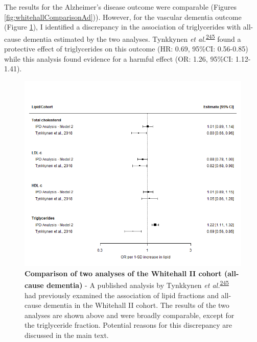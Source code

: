 \documentclass[a4paper, twoside]{templates/ociamthesis}
\begin{document}
The results for the Alzheimer's disease outcome were comparable (Figures \ref{fig:whitehallComparisonAd})). However, for the vascular dementia outcome (Figure \ref{fig:whitehallComparisonDementia}), I identified a discrepancy in the association of triglycerides with all-cause dementia estimated by the two analyses. Tynkkynen \emph{et al.}\textsuperscript{\protect\hyperlink{ref-tynkkynen2018}{245}} found a protective effect of triglycerides on this outcome (HR: 0.69, 95\%CI: 0.56-0.85) while this analysis found evidence for a harmful effect (OR: 1.26, 95\%CI: 1.12-1.41).





\begin{figure}[H]
\includegraphics[width=1\linewidth]{figures/ipd/whitehall_comparison_dementia} \caption[Comparison of two analyses of the Whitehall II cohort (all-cause dementia)]{\textbf{Comparison of two analyses of the Whitehall II cohort (all-cause dementia)} - A published analysis by Tynkkynen \emph{et al.}\textsuperscript{\protect\hyperlink{ref-tynkkynen2018}{245}} had previously examined the association of lipid fractions and all-cause dementia in the Whitehall II cohort. The results of the two analyses are shown above and were broadly comparable, except for the triglyceride fraction. Potential reasons for this discrepancy are discussed in the main text.}\label{fig:whitehallComparisonDementia}
\end{figure}
\end{document}
